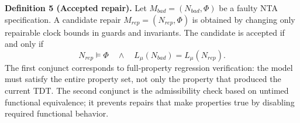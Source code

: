 \noindent\textbf{Definition 5 (Accepted repair).}
Let $M_{\mathit{bad}}=(N_{\mathit{bad}},\Phi)$ be
a faulty NTA specification. A candidate repair
$M_{\mathit{rep}}=(N_{\mathit{rep}},\Phi)$ is obtained by changing only
repairable clock bounds in guards and invariants. The candidate is
accepted if and only if
\begin{equation}
  N_{\mathit{rep}}
  \models
  \Phi
  \quad\land\quad
  L_\mu(N_{\mathit{bad}})
  =
  L_\mu(N_{\mathit{rep}}).
  \label{eq:accepted-repair}
\end{equation}
The first conjunct corresponds to full-property regression verification:
the model must satisfy the entire property set, not only the
property that produced the current TDT. The second conjunct is the
admissibility check based on untimed functional equivalence; it prevents
repairs that make properties true by disabling required functional
behavior.
